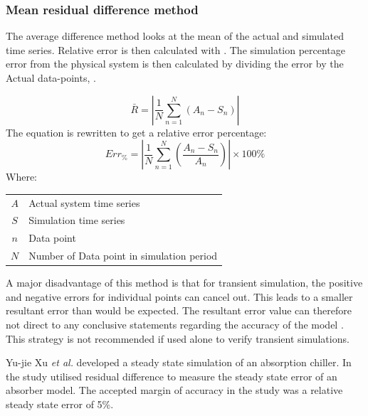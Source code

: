  		\subsubsection{Mean residual difference method}
 			The average difference method looks at the mean of the actual and simulated time series. Relative error is then calculated with . The simulation percentage error from the physical system is then calculated by dividing the error by the Actual data-points, .
 			
 			\begin{equation}
 			\label{eq: AMean absolute}
 			\bar{R} = \left| \dfrac{1}{N} \sum_{n=1}^{N}{ \left( A_{n} - S_{n}\right)} \right|
 			\end{equation}
The equation is rewritten to get a relative error percentage:	
 			\begin{equation}
 				\label{eq: Average difference}
 				Err_{\%} = \left| \dfrac{1}{N} \sum_{n=1}^{N}{ \left(\dfrac{ A_{n} - S_{n}}{A_n}\right)} \right| \times 100 \%
 			\end{equation}
 			Where: \par 
 				\begin{table}[h!]
 					\centering
 					\begin{tabular}{cl}
 						$A$ & Actual system time series \\
 						$S$ & Simulation time series \\
 						$n$ & Data point \\
 						$N$ & Number of Data point in simulation period \\
 					\end{tabular} 
 				\end{table}	
 			A major disadvantage of this method is that for transient simulation, the positive and negative errors for individual points can cancel out. This leads to a smaller resultant error than would be expected. The resultant error value can therefore not direct to any conclusive statements regarding the accuracy of the model \cite{sarin2010comparing}. This strategy is not recommended if used alone to verify transient simulations. 
 			\par 
 						
 			Yu-jie Xu \textit{et al.} \cite{xu2016modeling} developed a steady state simulation of an absorption chiller. In the study \cite{xu2016modeling} utilised residual difference to measure the steady state error of an absorber model. The accepted margin of accuracy in the study was a relative steady state error of 5\%. 
 			
